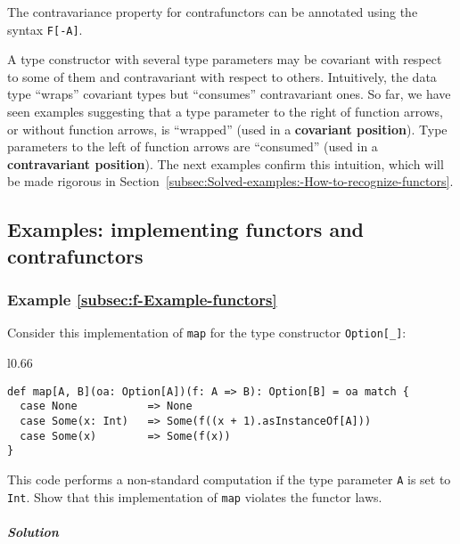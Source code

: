 The contravariance property for contrafunctors can be annotated using
the syntax \lstinline!F[-A]!.

A type constructor with several type parameters may be covariant with
respect to some of them and contravariant with respect to others.
Intuitively, the data type \textsf{``}wraps\textsf{''} covariant types but \textsf{``}consumes\textsf{''}
contravariant ones. So far, we have seen examples suggesting that
a type parameter to the right of function arrows, or without function
arrows, is \textsf{``}wrapped\textsf{''} (used in a \textbf{covariant position}).
Type parameters to the left of function arrows are \textsf{``}consumed\textsf{''}
(used in a \textbf{contravariant position}).
The next examples confirm this intuition, which will be made rigorous
in Section~\ref{subsec:Solved-examples:-How-to-recognize-functors}.

\subsection{Examples: implementing functors and contrafunctors}

\subsubsection{Example \label{subsec:f-Example-functors}\ref{subsec:f-Example-functors}}

Consider this implementation of \lstinline!map! for the type constructor
\lstinline!Option[_]!:

\begin{wrapfigure}{l}{0.66\columnwidth}%
\vspace{-0.85\baselineskip}
\begin{lstlisting}
def map[A, B](oa: Option[A])(f: A => B): Option[B] = oa match {
  case None           => None
  case Some(x: Int)   => Some(f((x + 1).asInstanceOf[A]))
  case Some(x)        => Some(f(x))
}
\end{lstlisting}

\vspace{-1\baselineskip}
\end{wrapfigure}%

\noindent This code performs a non-standard computation if the type
parameter \lstinline!A! is set to \lstinline!Int!. Show that this
implementation of \lstinline!map! violates the functor laws.

\subparagraph{Solution}

